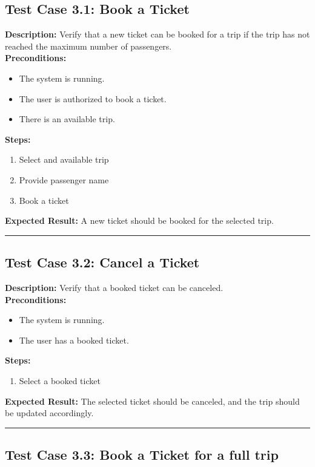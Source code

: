 \documentclass{article}
\begin{document}
\subsection{Test Case 3.1: Book a Ticket}

\textbf{Description:} Verify that a new ticket can be booked for a trip if the trip has not reached the maximum number of passengers.\\
\textbf{Preconditions:}
\begin{itemize}
  \item The system is running.
  \item The user is authorized to book a ticket.
  \item There is an available trip.
\end{itemize}
\textbf{Steps:}
\begin{enumerate}
  \item Select and available trip
  \item Provide passenger name
  \item Book a ticket
\end{enumerate}
\textbf{Expected Result:}  A new ticket should be booked for the selected trip.

\bigskip
\hrule
\bigskip

\subsection{Test Case 3.2: Cancel a Ticket}

\textbf{Description:} Verify that a booked ticket can be canceled.\\
\textbf{Preconditions:}
\begin{itemize}
  \item The system is running.
  \item The user has a booked ticket.
\end{itemize}
\textbf{Steps:}
\begin{enumerate}
  \item Select a booked ticket
\end{enumerate}
\textbf{Expected Result:} The selected ticket should be canceled, and the trip should be updated accordingly.

\bigskip
\hrule
\bigskip

\subsection{Test Case 3.3: Book a Ticket for a full trip}
\end{document}
